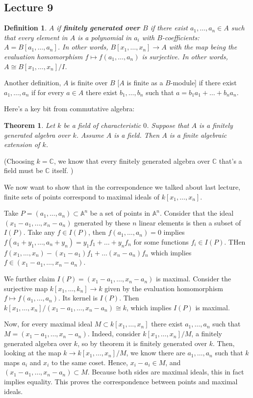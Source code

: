\documentclass[12pt]{article}
\newcommand{\C}{\mathbb{C}}
\newcommand{\A}{\mathbb{A}}
\newtheorem{definition}{Definition}
\newtheorem{theorem}{Theorem}
\begin{document}
    \subsection{Lecture 9}
    \begin{definition}
        $A$ if \textbf{finitely generated over $B$} if there exist $a_1, \dots, a_n \in A$ such that every element in $A$ is a polynomial in $a_i$ with $B$-coefficients: $A = B[a_1, \dots, a_n]$. In other words, $B[x_1, \dots, x_n] \to A$ with the map being the evaluation homomorphism $f \mapsto f(a_1, \dots, a_n)$ is surjective. In other words, $A \cong B[x_1, \dots, x_n]/I$. 
    \end{definition}
    Another definition, $A$ is finite over $B$ [$A$ is finite as a $B$-module] if there exist $a_1, \dots, a_n$ if for every $a \in A$ there exist $b_1, \dots, b_n$ such that $a = b_1a_1 + \dots + b_na_n$.\par 
    Here's a key bit from commutative algebra: 
    \begin{theorem}
        Let $k$ be a field of characteristic $0$. Suppose that $A$ is a finitely generated algebra over $k$. Assume $A$ is a field. Then $A$ is a finite algebraic extension of $k$. 
    \end{theorem}
    (Choosing $k = \C$, we know that every finitely generated algebra over $\C$ that's a field must be $\C$ itself. )\par
    We now want to show that in the correspondence we talked about last lecture, finite sets of points correspond to maximal ideals of $k[x_1, \dots, x_n]$. \par 
    Take $P = (a_1, \dots, a_n) \subset \A^n$ be a set of points in $\A^n$. Consider that the ideal $(x_1 - a_1, \dots, x_n - a_n)$ generated by these $n$ linear elements is then a subset of $I(P)$. Take any $f \in I(P)$, then $f(a_1, \dots, a_n) = 0$ implies $f(a_1 + y_1, \dots, a_n + y_n) = y_1f_1 + \dots + y_nf_n$ for some functions $f_i \in I(P)$. THen $f(x_1, \dots, x_n) - (x_1 - a_1)f_1 + \dots (x_n - a_n)f_n$ which implies $f \in (x_1-a_1, \dots, x_n-a_n)$. \par 
    We further claim $I(P) = (x_1 - a_1, \dots, x_n - a_n)$ is maximal. Consider the surjective map $k[x_1, \dots, k_n] \to k $ given by the evaluation homomorphism $f \mapsto f(a_1, \dots, a_n)$. Its kernel is $I(P)$. Then $k[x_1, \dots, x_n]/(x_1- a_1, \dots, x_n - a_n) \cong k$, which implies $I(P)$ is maximal. \par 
    Now, for every maximal ideal $M \subset k[x_1, \dots, x_n]$ there exist $a_1, \dots, a_n$ such that $M = (x_1 - a_1, \dots, x_n - a_n)$. Indeed, consider $k[x_1, \dots, x_n]/M$, a finitely generated algebra over $k$, so by theorem it is finitely generated over $k$. Then, looking at the map $k \to k[x_1, \dots, x_n]/M$, we know there are $a_1, \dots, a_n$ such that $k$ maps $a_i$ and $x_i$ to the same coset. Hence, $x_i - a_i \in M$, and $(x_1 - a_1, \dots, x_n - a_n) \subset M$. Because both sides are maximal ideals, this in fact implies equality. This proves the correspondence between points and maximal ideals. \par 
\end{document}
